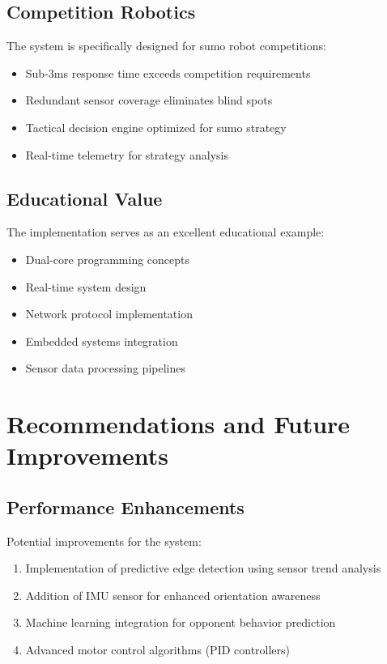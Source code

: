 \documentclass[12pt,a4paper]{article}
\begin{document}
\subsection{Competition Robotics}

The system is specifically designed for sumo robot competitions:

\begin{itemize}
    \item Sub-3ms response time exceeds competition requirements
    \item Redundant sensor coverage eliminates blind spots
    \item Tactical decision engine optimized for sumo strategy
    \item Real-time telemetry for strategy analysis
\end{itemize}

\subsection{Educational Value}

The implementation serves as an excellent educational example:

\begin{itemize}
    \item Dual-core programming concepts
    \item Real-time system design
    \item Network protocol implementation
    \item Embedded systems integration
    \item Sensor data processing pipelines
\end{itemize}

\section{Recommendations and Future Improvements}

\subsection{Performance Enhancements}

Potential improvements for the system:

\begin{enumerate}
    \item Implementation of predictive edge detection using sensor trend analysis
    \item Addition of IMU sensor for enhanced orientation awareness
    \item Machine learning integration for opponent behavior prediction
    \item Advanced motor control algorithms (PID controllers)
\end{enumerate}
\end{document}
